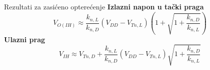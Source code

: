 \begin{frame}[label=09_1-s054]{Rezultati za zasićeno opterećenje}\setlength{\parskip}{2pt}\setlength{\abovedisplayskip}{4pt}\setlength{\belowdisplayskip}{4pt}\setlength{\abovedisplayshortskip}{3pt}\setlength{\belowdisplayshortskip}{3pt}
\textbf{Izlazni napon u tački praga}\[V_{O(IH)}\approx\frac{k_{n,L}}{k_{n,D}}(V_{DD}-V_{Tn,L})\left(1+\sqrt{1+\frac{k_{n,D}}{k_{n,L}}}\right)\]
\bigskip\textbf{Ulazni prag}\[V_{IH}\approx V_{Tn,D}+\frac{k_{n,L}}{k_{n,D}}(V_{DD}-V_{Tn,L})\sqrt{1+\frac{k_{n,D}}{k_{n,L}}}\]

\end{frame}
